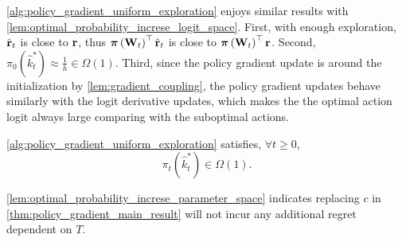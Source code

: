 \cref{alg:policy_gradient_uniform_exploration} enjoys similar results with \cref{lem:optimal_probability_increse_logit_space}. First, with enough exploration, $\hat{{\mathbf{r}}}_t$ is close to ${\mathbf{r}}$, thus ${\boldsymbol{\pi}}\left({\mathbf{W}}_t\right)^\top \hat{{\mathbf{r}}}_t$ is close to ${\boldsymbol{\pi}}\left({\mathbf{W}}_t\right)^\top {\mathbf{r}}$. Second, $\pi_{0}(\hat{k}_t^*) \approx \frac{1}{h} \in \Omega(1)$. Third, since the policy gradient update is around the initialization by \cref{lem:gradient_coupling}, the policy gradient updates behave similarly with the logit derivative updates, which makes the the optimal action logit always large comparing with the suboptimal actions.
\begin{lem}
\label{lem:optimal_probability_increse_parameter_space}
\cref{alg:policy_gradient_uniform_exploration} satisfies, $\forall t \ge 0$,
\begin{equation*}
    \pi_{t}(\hat{k}_t^*) \in \Omega(1).
\end{equation*}
\end{lem}
\cref{lem:optimal_probability_increse_parameter_space} indicates replacing $c$ in \cref{thm:policy_gradient_main_result} will not incur any additional regret dependent on $T$.
\fi